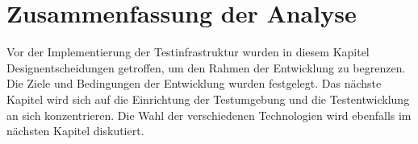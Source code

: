 \section{Zusammenfassung der Analyse}

Vor der Implementierung der Testinfrastruktur wurden in diesem Kapitel
Designentscheidungen getroffen, um den Rahmen der Entwicklung zu
begrenzen. Die Ziele und Bedingungen der Entwicklung wurden
festgelegt. Das nächste Kapitel wird sich auf die Einrichtung der
Testumgebung und die Testentwicklung an sich konzentrieren. Die Wahl
der verschiedenen Technologien wird ebenfalls im nächsten Kapitel
diskutiert.